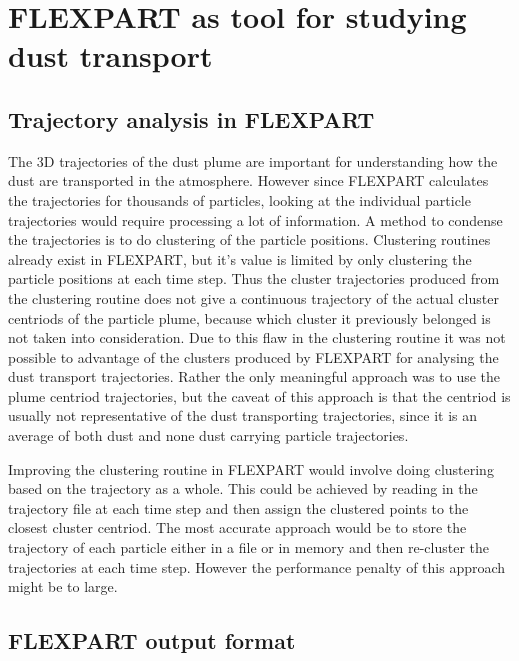 
\section{FLEXPART as tool for studying dust transport} 
\subsection{Trajectory analysis in FLEXPART}
The 3D trajectories of the dust plume are important for understanding how the dust are transported in the atmosphere. However since FLEXPART calculates the trajectories for thousands of particles, looking at the individual particle trajectories would require processing a lot of information. A method to condense the trajectories is to do clustering of the particle positions. Clustering routines already exist in FLEXPART, but it's value is limited by only clustering the particle positions at each time step. Thus the cluster trajectories produced from the clustering routine does not give a continuous trajectory of the actual cluster centriods of the particle plume, because which cluster it previously belonged is not taken into consideration. Due to this flaw in the clustering routine it was not possible to advantage of the clusters produced by FLEXPART for analysing the dust transport trajectories. Rather the only meaningful approach was to use the plume centriod trajectories, but the caveat of this approach is that the centriod is usually not representative of the dust transporting trajectories, since it is an average of both dust and none dust carrying particle trajectories.

Improving the clustering routine in FLEXPART would involve doing clustering based on the trajectory as a whole. This could be achieved by reading in the trajectory file at each time step and then assign the clustered points to the closest cluster centriod. The most accurate approach would be to store the trajectory of each particle either in a file or in memory and then re-cluster the trajectories at each time step. However the performance penalty of this approach might be to large.

\subsection{FLEXPART output format}

